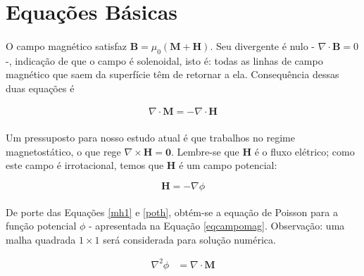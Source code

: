 \documentclass[a4paper,11pt]{article}
\newcommand{\eqname}[1]{\tag*{#1}}%
\begin{document}
\maketitle

\newpage

\section{Equações Básicas}

\paragraph{} O campo magnético satisfaz $\mathbf{B} = \mu_0(\mathbf{M}+\mathbf{H})$. Seu divergente é nulo - $\nabla\cdot \mathbf{B} =  0$ -, indicação de que o campo é solenoidal, isto é: todas as linhas de campo magnético que saem da superfície têm de retornar a ela. Consequência dessas duas equações é


\begin{eqnarray}
\nabla\cdot \mathbf{M} = -\nabla\cdot\mathbf{H}	\label{mh1}
\end{eqnarray}


\paragraph{} Um pressuposto para nosso estudo atual é que trabalhos no regime magnetostático, o que rege $\nabla\times \mathbf{H} = \mathbf{0}$. Lembre-se que $\mathbf{H}$ é o fluxo elétrico; como este campo é irrotacional, temos que $\mathbf{H}$ é um campo potencial:

\begin{equation}
\mathbf{H} = -\nabla\phi \label{poth}	
\end{equation}

\paragraph{} De porte das Equações \ref{mh1} e \ref{poth}, obtém-se a equação de Poisson para a função potencial $\phi$ - apresentada na Equação \ref{eqcampomag}. Observação: uma malha quadrada $1\times 1$ será considerada para solução numérica.

\begin{align}
\nabla^2\phi &= \nabla\cdot \mathbf{M}\label{eqcampomag}\\ \eqname{Equação da Função Potencial}
\end{align}
\end{document}
